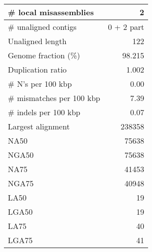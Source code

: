 \documentclass[12pt,a4paper]{article}
\begin{document}
\begin{table}[ht]
\begin{center}
\begin{tabular}{|l*{1}{|r}|}
\# local misassemblies & 2 \\ \hline
\# unaligned contigs & 0 + 2 part \\ \hline
Unaligned length & 122 \\ \hline
Genome fraction (\%) & 98.215 \\ \hline
Duplication ratio & 1.002 \\ \hline
\# N's per 100 kbp & 0.00 \\ \hline
\# mismatches per 100 kbp & 7.39 \\ \hline
\# indels per 100 kbp & 0.07 \\ \hline
Largest alignment & 238358 \\ \hline
NA50 & 75638 \\ \hline
NGA50 & 75638 \\ \hline
NA75 & 41453 \\ \hline
NGA75 & 40948 \\ \hline
LA50 & 19 \\ \hline
LGA50 & 19 \\ \hline
LA75 & 40 \\ \hline
LGA75 & 41 \\ \hline
\end{tabular}
\end{center}
\end{table}
\end{document}
